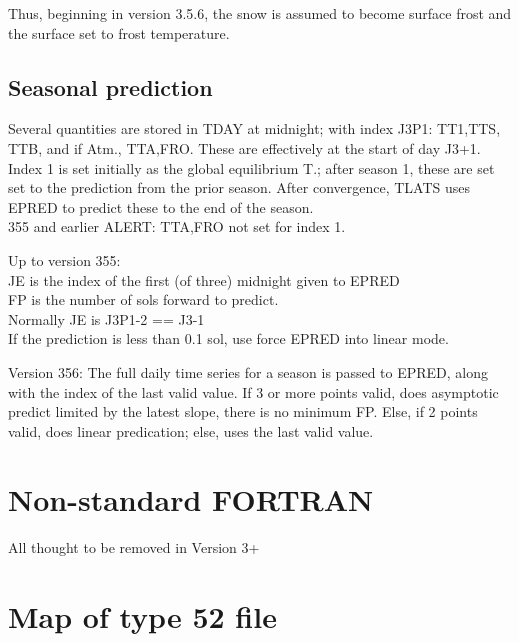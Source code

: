 \documentclass{article}
\newcommand{\qi}{\\ \hspace*{2.em}}      %
\begin{document}
Thus, beginning in version 3.5.6, the snow is assumed to become surface frost
and the surface set to frost temperature.


\subsection{Seasonal prediction} %

Several quantities are stored in TDAY at midnight;
 with index J3P1: TT1,TTS, TTB, and if Atm., TTA,FRO. These are effectively at the start of day J3+1. Index 1 is set initially as the global equilibrium T.; after season 1, these are set set to the prediction from the prior season.
After convergence, TLATS uses EPRED to predict these to the end of the season.
\\ 355 and earlier ALERT:  TTA,FRO not set for index 1.

Up to version 355:
\\ JE is the index  of the first (of three) midnight given to EPRED
\\ FP is the number of sols forward to predict.
\qi Normally JE is J3P1-2 == J3-1
\qi If the prediction is less than 0.1 sol, use force EPRED into linear mode.

Version 356: The full daily time series for a season is passed to EPRED, along with the index of the last valid value.  If 3 or more points valid, does asymptotic predict limited by the latest slope, there is no minimum FP.
Else, if 2 points valid, does linear predication; else, uses the last valid value.

\section{Non-standard FORTRAN}
All thought to be removed in Version 3+

\appendix %

\section{Map of type 52 file \label{type52}}

\end{document}

